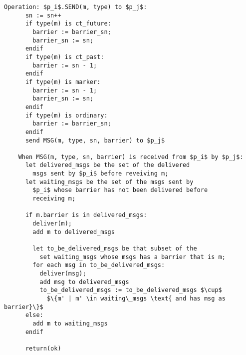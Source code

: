 \documentclass[12pt]{article}
\theoremstyle{plain}
\begin{document}
\clearpage

\begin{lstlisting}[frame=single]
    Operation: $p_i$.SEND(m, type) to $p_j$:
      sn := sn++
      if type(m) is ct_future:
        barrier := barrier_sn;
        barrier_sn := sn;
      endif
      if type(m) is ct_past:
        barrier := sn - 1;
      endif
      if type(m) is marker:
        barrier := sn - 1;
        barrier_sn := sn;
      endif
      if type(m) is ordinary:
        barrier := barrier_sn;
      endif
      send MSG(m, type, sn, barrier) to $p_j$

    When MSG(m, type, sn, barrier) is received from $p_i$ by $p_j$:
      let delivered_msgs be the set of the delivered 
        msgs sent by $p_i$ before reveiving m;
      let waiting_msgs be the set of the msgs sent by
        $p_i$ whose barrier has not been delivered before
        receiving m;

      if m.barrier is in delivered_msgs:
        deliver(m);
        add m to delivered_msgs

        let to_be_delivered_msgs be that subset of the
          set waiting_msgs whose msgs has a barrier that is m;
        for each msg in to_be_delivered_msgs:
          deliver(msg);
          add msg to delivered_msgs
          to_be_delivered_msgs := to_be_delivered_msgs $\cup$
            $\{m' | m' \in waiting\_msgs \text{ and has msg as barrier}\}$
      else:
        add m to waiting_msgs
      endif

      return(ok)
 
\end{lstlisting}

\clearpage
\end{document}
